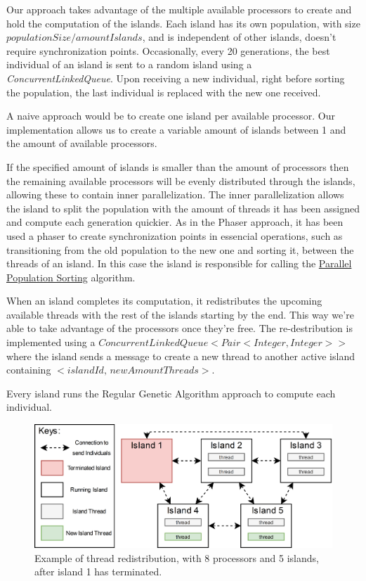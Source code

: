 \documentclass[runningheads]{llncs}
\begin{document}
Our approach takes advantage of the multiple available processors to create and hold the computation of the islands. Each island has its own population, with size  \(populationSize / amountIslands \), and is independent of other islands, doesn't require synchronization points. Occasionally, every 20 generations, the best individual of an island is sent to a random island using a \emph{ConcurrentLinkedQueue}. Upon receiving a new individual, right before sorting the population, the last individual is replaced with the new one received.

A naive approach would be to create one island per available processor. Our implementation allows us to create a variable amount of islands between 1 and the amount of available processors.

 If the specified amount of islands is smaller than the amount of processors then the remaining available processors will be evenly distributed through the islands, allowing these to contain inner parallelization. The inner parallelization allows the island to split the population with the amount of threads it has been assigned and compute each generation quickier. As in the Phaser approach, it has been used a phaser to create synchronization points in essencial operations, such as transitioning from the old population to the new one and sorting it, between the threads of an island. In this case the island is responsible for calling the \hyperref[subsubsec:parallelSort]{Parallel Population Sorting} algorithm.

When an island completes its computation, it redistributes the upcoming available threads with the rest of the islands starting by the end. This way we're able to take advantage of the processors once they're free. The re-destribution is implemented using a \(ConcurrentLinkedQueue<Pair<Integer, Integer>>\) where the island sends a message to create a new thread to another active island containing \(<islandId, \,newAmountThreads>\).

Every island runs the Regular Genetic Algorithm approach to compute each individual.

\begin{figure}[htbp]
\centering
\includegraphics[width=.92\textwidth]{IslandModel.png}
\caption{Example of thread redistribution, with 8 processors and 5 islands, after island 1 has terminated.} \label{islandDiagram}
\end{figure}
\end{document}
